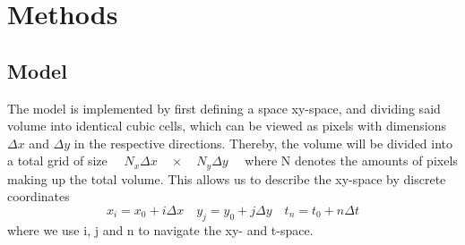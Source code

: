 \documentclass[10pt, nofootinbib, twocolumn]{revtex4-1}
\begin{document}
\section{Methods}\label{sec:methods} 
\subsection{Model}
The model is implemented by first defining a space xy-space, and dividing said volume into identical cubic cells, which can be viewed as pixels with dimensions $\Delta x$ and $\Delta y$ in the respective directions. Thereby, the volume will be divided into a total grid of size $\quad N_x  \Delta x \quad \times \quad N_y \Delta y \quad $ where N denotes the amounts of pixels making up the total volume. This allows us to describe the xy-space by discrete coordinates $$x_i = x_0 +i\Delta x \quad y_j = y_0 +j\Delta y \quad t_n = t_0 +n\Delta t$$ where we use i, j and n to navigate the xy- and t-space. 
\end{document}
